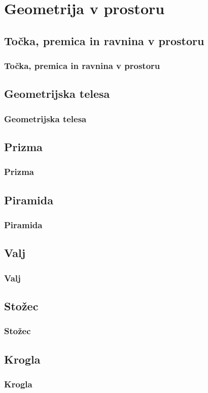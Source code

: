 \section{Geometrija v prostoru}

\begin{frame}
    \sectionpage
\end{frame}

\begin{frame}
\end{frame}

    \subsection{Točka, premica in ravnina v prostoru}

        \begin{frame}
            \frametitle{Točka, premica in ravnina v prostoru}
        \end{frame}

    \subsection{Geometrijska telesa}

        \begin{frame}
            \frametitle{Geometrijska telesa}
        \end{frame}

    \subsection{Prizma}

        \begin{frame}
            \frametitle{Prizma}
        \end{frame}

    \subsection{Piramida}

        \begin{frame}
            \frametitle{Piramida}
        \end{frame}

    \subsection{Valj}

        \begin{frame}
            \frametitle{Valj}
        \end{frame}

    \subsection{Stožec}

        \begin{frame}
            \frametitle{Stožec}
        \end{frame}

    \subsection{Krogla}

        \begin{frame}
            \frametitle{Krogla}
        \end{frame}
